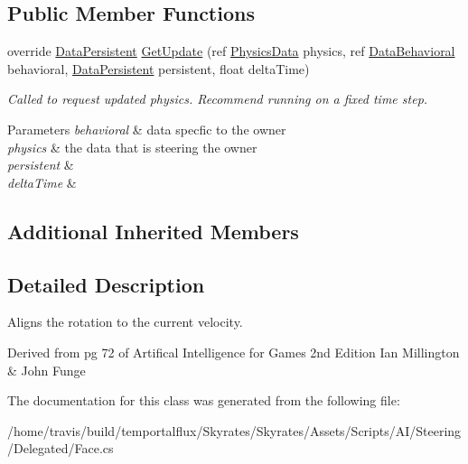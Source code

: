 \subsection*{Public Member Functions}
\begin{DoxyCompactItemize}
\item 
\hypertarget{class_skyrates_1_1_a_i_1_1_steering_1_1_delegated_1_1_face_a6f82ebabdc84fef7dca1ad53cd3498a6}{override \hyperlink{class_skyrates_1_1_a_i_1_1_behavior_1_1_data_persistent}{Data\-Persistent} \hyperlink{class_skyrates_1_1_a_i_1_1_steering_1_1_delegated_1_1_face_a6f82ebabdc84fef7dca1ad53cd3498a6}{Get\-Update} (ref \hyperlink{class_skyrates_1_1_physics_1_1_physics_data}{Physics\-Data} physics, ref \hyperlink{class_skyrates_1_1_a_i_1_1_behavior_1_1_data_behavioral}{Data\-Behavioral} behavioral, \hyperlink{class_skyrates_1_1_a_i_1_1_behavior_1_1_data_persistent}{Data\-Persistent} persistent, float delta\-Time)}\label{class_skyrates_1_1_a_i_1_1_steering_1_1_delegated_1_1_face_a6f82ebabdc84fef7dca1ad53cd3498a6}

\begin{DoxyCompactList}\small\item\em Called to request updated physics. Recommend running on a fixed time step. 


\begin{DoxyParams}{Parameters}
{\em behavioral} & data specfic to the owner\\
\hline
{\em physics} & the data that is steering the owner\\
\hline
{\em persistent} & \\
\hline
{\em delta\-Time} & \\
\hline
\end{DoxyParams}
 \end{DoxyCompactList}\end{DoxyCompactItemize}
\subsection*{Additional Inherited Members}


\subsection{Detailed Description}
Aligns the rotation to the current velocity. 

Derived from pg 72 of Artifical Intelligence for Games 2nd Edition Ian Millington \& John Funge 

The documentation for this class was generated from the following file\-:\begin{DoxyCompactItemize}
\item 
/home/travis/build/temportalflux/\-Skyrates/\-Skyrates/\-Assets/\-Scripts/\-A\-I/\-Steering/\-Delegated/Face.\-cs\end{DoxyCompactItemize}
